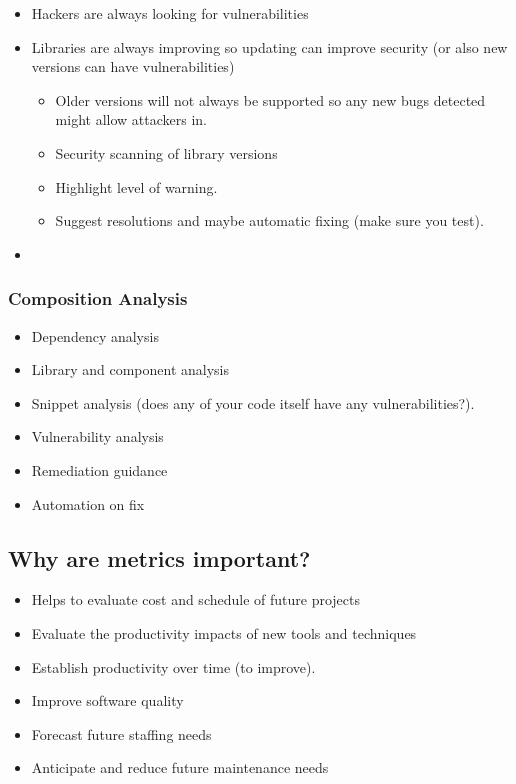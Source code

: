 \begin{itemize}
	\item Hackers are always looking for vulnerabilities
	\item Libraries are always improving so updating can improve security (or also new versions can have vulnerabilities)
	      \begin{itemize}
		      \item Older versions will not always be supported so any new bugs detected might allow attackers in.
		      \item Security scanning of library versions
		      \item Highlight level of warning.
		      \item Suggest resolutions and maybe automatic fixing (make sure you test).
	      \end{itemize}
	\item
\end{itemize}

\subsubsection{Composition Analysis}\label{ssub:composition_analysis}

\begin{itemize}
	\item Dependency analysis
	\item Library and component analysis
	\item Snippet analysis (does any of your code itself have any vulnerabilities?).
	\item Vulnerability analysis
	\item Remediation guidance
	\item Automation on fix
\end{itemize}

\subsection{Why are metrics important?}\label{sub:why_are_metrics_important_}

\begin{itemize}
	\item Helps to evaluate cost and schedule of future projects
	\item Evaluate the productivity impacts of new tools and techniques
	\item Establish productivity over time (to improve).
	\item Improve software quality
	\item Forecast future staffing needs
	\item Anticipate and reduce future maintenance needs
\end{itemize}

